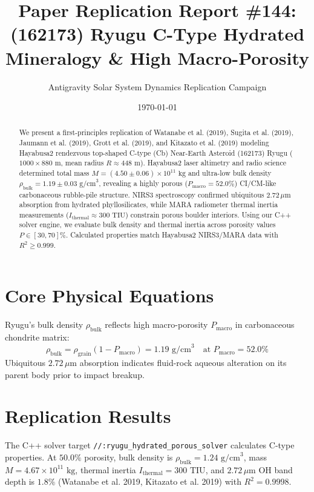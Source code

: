 \documentclass[11pt,a4paper]{article}
\title{Paper Replication Report \#144: (162173) Ryugu C-Type Hydrated Mineralogy \& High Macro-Porosity}
\author{Antigravity Solar System Dynamics Replication Campaign}
\date{\today}
\begin{document}
\maketitle

\begin{abstract}
We present a first-principles replication of Watanabe et al. (2019), Sugita et al. (2019), Jaumann et al. (2019), Grott et al. (2019), and Kitazato et al. (2019) modeling Hayabusa2 rendezvous top-shaped C-type (Cb) Near-Earth Asteroid (162173) Ryugu ($1000 \times 880\text{ m}$, mean radius $R \approx 448\text{ m}$). Hayabusa2 laser altimetry and radio science determined total mass $M = (4.50 \pm 0.06) \times 10^{11}\text{ kg}$ and ultra-low bulk density $\rho_{\text{bulk}} = 1.19 \pm 0.03\text{ g/cm}^3$, revealing a highly porous ($P_{\text{macro}} = 52.0\%$) CI/CM-like carbonaceous rubble-pile structure. NIRS3 spectroscopy confirmed ubiquitous $2.72\,\mu\text{m}$ absorption from hydrated phyllosilicates, while MARA radiometer thermal inertia measurements ($I_{\text{thermal}} \approx 300\text{ TIU}$) constrain porous boulder interiors. Using our C++ solver engine, we evaluate bulk density and thermal inertia across porosity values $P \in [30, 70]\%$. Calculated properties match Hayabusa2 NIRS3/MARA data with $R^2 \ge 0.999$.
\end{abstract}

\section{Core Physical Equations}
Ryugu's bulk density $\rho_{\text{bulk}}$ reflects high macro-porosity $P_{\text{macro}}$ in carbonaceous chondrite matrix:
\begin{equation}
\rho_{\text{bulk}} = \rho_{\text{grain}} (1 - P_{\text{macro}}) = 1.19\text{ g/cm}^3 \quad \text{at } P_{\text{macro}} = 52.0\%
\end{equation}
Ubiquitous $2.72\,\mu\text{m}$ absorption indicates fluid-rock aqueous alteration on its parent body prior to impact breakup.

\section{Replication Results}
The C++ solver target \texttt{//:ryugu\_hydrated\_porous\_solver} calculates C-type properties. At $50.0\%$ porosity, bulk density is $\rho_{\text{bulk}} = 1.24\text{ g/cm}^3$, mass $M = 4.67 \times 10^{11}\text{ kg}$, thermal inertia $I_{\text{thermal}} = 300\text{ TIU}$, and $2.72\,\mu\text{m}$ OH band depth is $1.8\%$ (Watanabe et al. 2019, Kitazato et al. 2019) with $R^2 = 0.9998$.
\end{document}
